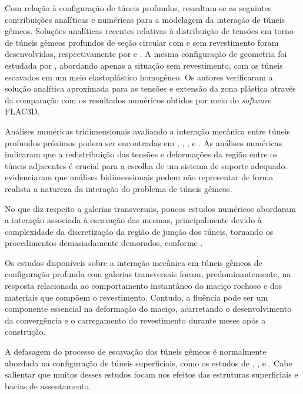 Com relação à configuração de túneis profundos, ressaltam-se as seguintes contribuições analíticas e numéricas para a modelagem da interação de túneis gêmeos. Soluções analíticas recentes relativas à distribuição de tensões em torno de túneis gêmeos profundos de seção circular com e sem revestimento foram desenvolvidas, respectivamente por  e . A mesma configuração de geometria foi estudada por , abordando apenas a situação sem revestimento, com os túneis escavados em um meio elastoplástico homogêneo. Os autores verificaram a solução analítica aproximada para as tensões e extensão da zona plástica através da comparação com os resultados numéricos obtidos por meio do \textit{software} FLAC3D.

Análises numéricas tridimensionais avaliando a interação mecânica entre túneis profundos próximos podem ser encontradas em , , ,  e . As análises numéricas indicaram que a redistribuição das tensões e deformações da região entre os túneis adjacentes é crucial para a escolha de um sistema de suporte adequado.  evidenciaram que análises bidimensionais podem não representar de forma realista a natureza da interação do problema de túneis gêmeos.
  
No que diz respeito a galerias transversais, poucos estudos numéricos abordaram a interação associada à escavação das mesmas, principalmente devido à complexidade da discretização da região de junção dos túneis, tornando os procedimentos demasiadamente demorados, conforme .

Os estudos disponíveis sobre a interação mecânica em túneis gêmeos de configuração profunda com galerias transversais focam, predominantemente, na resposta relacionada ao comportamento instantâneo do maciço rochoso e dos materiais que compõem o revestimento. Contudo, a fluência pode ser um componente essencial na deformação do maciço, acarretando o desenvolvimento da convergência e o carregamento do revestimento durante meses após a construção. %

A defasagem do processo de escavação dos túneis gêmeos é normalmente abordada na configuração de túneis superficiais, como os estudos de , ,  e . Cabe salientar que muitos desses estudos focam nos efeitos das estruturas superficiais e bacias de assentamento.

